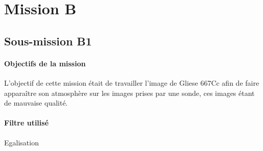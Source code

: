 \section{Mission B}
	\subsection{Sous-mission B1}

	\begin{vwcol}[widths={0.8,0.2}, rule=0pt]
	\begin{minipage}{0.7\textwidth}
	\paragraph{Objectifs de la mission}

	L'objectif de cette mission était de travailler l'image de Gliese 667Cc afin de faire apparaître son atmosphère sur les images prises par une sonde, ces images étant de mauvaise qualité. 
	\end{minipage}
	\begin{minipage}{0.2\textwidth}
		\begin{flushright}
			\paragraph{Filtre utilisé}
		Egalisation
		\end{flushright}
	\end{minipage}
	\end{vwcol} 

